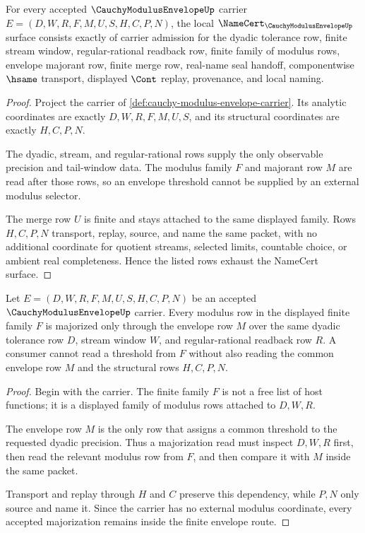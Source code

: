 \begin{theorem}
\label{thm:cauchy-modulus-envelope-namecert-obligations}
For every accepted $\CauchyModulusEnvelopeUp$ carrier $E=(D,W,R,F,M,U,S,H,C,P,N)$, the local $\NameCert_{\CauchyModulusEnvelopeUp}$ surface consists exactly of carrier admission for the dyadic tolerance row, finite stream window, regular-rational readback row, finite family of modulus rows, envelope majorant row, finite merge row, real-name seal handoff, componentwise $\hsame$ transport, displayed $\Cont$ replay, provenance, and local naming.
\end{theorem}
\begin{proof}
Project the carrier of \autoref{def:cauchy-modulus-envelope-carrier}. Its analytic coordinates are exactly $D,W,R,F,M,U,S$, and its structural coordinates are exactly $H,C,P,N$.

The dyadic, stream, and regular-rational rows supply the only observable precision and tail-window data. The modulus family $F$ and majorant row $M$ are read after those rows, so an envelope threshold cannot be supplied by an external modulus selector.

The merge row $U$ is finite and stays attached to the same displayed family. Rows $H,C,P,N$ transport, replay, source, and name the same packet, with no additional coordinate for quotient streams, selected limits, countable choice, or ambient real completeness. Hence the listed rows exhaust the NameCert surface.
\end{proof}

\begin{theorem}
\label{thm:cauchy-modulus-envelope-modulus-majorization}
Let $E=(D,W,R,F,M,U,S,H,C,P,N)$ be an accepted $\CauchyModulusEnvelopeUp$ carrier. Every modulus row in the displayed finite family $F$ is majorized only through the envelope row $M$ over the same dyadic tolerance row $D$, stream window $W$, and regular-rational readback row $R$. A consumer cannot read a threshold from $F$ without also reading the common envelope row $M$ and the structural rows $H,C,P,N$.
\end{theorem}
\begin{proof}
Begin with the carrier. The finite family $F$ is not a free list of host functions; it is a displayed family of modulus rows attached to $D,W,R$.

The envelope row $M$ is the only row that assigns a common threshold to the requested dyadic precision. Thus a majorization read must inspect $D,W,R$ first, then read the relevant modulus row from $F$, and then compare it with $M$ inside the same packet.

Transport and replay through $H$ and $C$ preserve this dependency, while $P,N$ only source and name it. Since the carrier has no external modulus coordinate, every accepted majorization remains inside the finite envelope route.
\end{proof}

